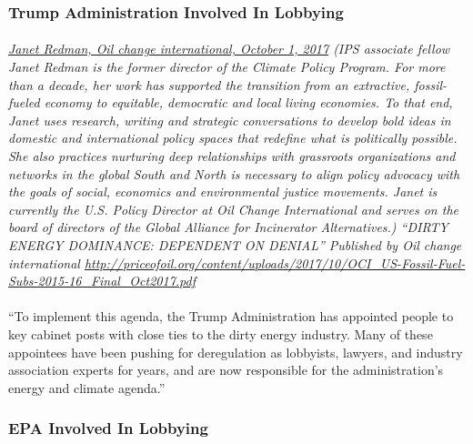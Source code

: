 \documentclass{article}
\begin{document}
\subsubsection{Trump Administration Involved In Lobbying}
\paragraph{}
\small
\textit{
\underline{Janet Redman, Oil change international, October 1, 2017}
(IPS associate fellow Janet Redman is the former director of the Climate Policy Program. For more than a decade, her work has supported the transition from an extractive, fossil-fueled economy to equitable, democratic and local living economies. To that end, Janet uses research, writing and strategic conversations to develop bold ideas in domestic and international policy spaces that redefine what is politically possible. She also practices nurturing deep relationships with grassroots organizations and networks in the global South and North is necessary to align policy advocacy with the goals of social, economics and environmental justice movements. Janet is currently the U.S. Policy Director at Oil Change International and serves on the board of directors of the Global Alliance for Incinerator Alternatives.) “DIRTY ENERGY DOMINANCE: DEPENDENT ON DENIAL” Published by Oil change international
\url{http://priceofoil.org/content/uploads/2017/10/OCI_US-Fossil-Fuel-Subs-2015-16_Final_Oct2017.pdf }}
\normalsize

\paragraph{}
``To implement this agenda, the Trump Administration has appointed people to key cabinet posts with close ties to the dirty energy industry. Many of these appointees have been pushing for deregulation as lobbyists, lawyers, and industry association experts for years, and are now responsible for the administration’s energy and climate agenda.”

\subsubsection{EPA Involved In Lobbying}
\end{document}
